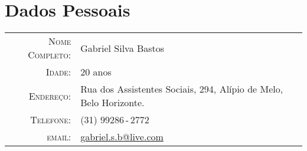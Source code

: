 \documentclass[a4paper,10pt]{article}
\renewcommand\#{\protect\scalebox{0.8}{\protect\raisebox{0.4ex}{\char"0023}}}
\begin{document}
\pagestyle{empty} %

\par{
  \bigskip
  \par
}

\section{Dados Pessoais}

\begin{tabular}{rl}
  \textsc{Nome Completo:} & Gabriel Silva Bastos \\
  \textsc{Idade:}         & 20 anos \\
  \textsc{Endereço:}      & Rua dos Assistentes Sociais, 294, Alípio de Melo, Belo Horizonte. \\
  \textsc{Telefone:}      & (31) 99286\,-\,2772 \\
  \textsc{email:}         & \href{mailto:gabriel.s.b@live.com}{gabriel.s.b@live.com}
\end{tabular}
\end{document}
